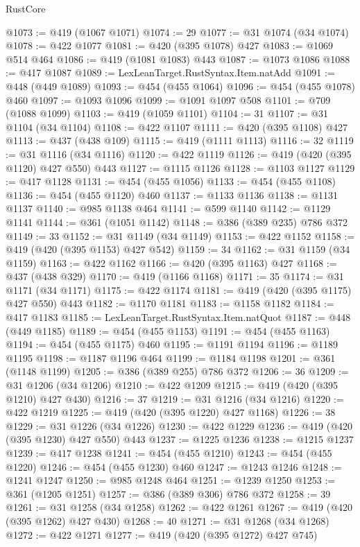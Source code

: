 \begin{lexlean}{RustCore}
\begin{coremodule}
@1073 := @419 (@1067 @1071)
@1074 := 29
@1077 := @31 @1074 (@34 @1074)
@1078 := @422 @1077
@1081 := @420 (@395 @1078) @427
@1083 := @1069 @514 @464
@1086 := @419 (@1081 @1083) @443
@1087 := @1073 @1086
@1088 := @417 @1087
@1089 := LexLeanTarget.RustSyntax.Item.natAdd
@1091 := @448 (@449 @1089)
@1093 := @454 (@455 @1064)
@1096 := @454 (@455 @1078) @460
@1097 := @1093 @1096
@1099 := @1091 @1097 @508
@1101 := @709 (@1088 @1099)
@1103 := @419 (@1059 @1101)
@1104 := 31
@1107 := @31 @1104 (@34 @1104)
@1108 := @422 @1107
@1111 := @420 (@395 @1108) @427
@1113 := @437 (@438 @109)
@1115 := @419 (@1111 @1113)
@1116 := 32
@1119 := @31 @1116 (@34 @1116)
@1120 := @422 @1119
@1126 := @419 (@420 (@395 @1120) @427 @550) @443
@1127 := @1115 @1126
@1128 := @1103 @1127
@1129 := @417 @1128
@1131 := @454 (@455 @1056)
@1133 := @454 (@455 @1108)
@1136 := @454 (@455 @1120) @460
@1137 := @1133 @1136
@1138 := @1131 @1137
@1140 := @985 @1138 @464
@1141 := @599 @1140
@1142 := @1129 @1141
@1144 := @361 (@1051 @1142)
@1148 := @386 (@389 @235) @786 @372
@1149 := 33
@1152 := @31 @1149 (@34 @1149)
@1153 := @422 @1152
@1158 := @419 (@420 (@395 @1153) @427 @542)
@1159 := 34
@1162 := @31 @1159 (@34 @1159)
@1163 := @422 @1162
@1166 := @420 (@395 @1163) @427
@1168 := @437 (@438 @329)
@1170 := @419 (@1166 @1168)
@1171 := 35
@1174 := @31 @1171 (@34 @1171)
@1175 := @422 @1174
@1181 := @419 (@420 (@395 @1175) @427 @550) @443
@1182 := @1170 @1181
@1183 := @1158 @1182
@1184 := @417 @1183
@1185 := LexLeanTarget.RustSyntax.Item.natQuot
@1187 := @448 (@449 @1185)
@1189 := @454 (@455 @1153)
@1191 := @454 (@455 @1163)
@1194 := @454 (@455 @1175) @460
@1195 := @1191 @1194
@1196 := @1189 @1195
@1198 := @1187 @1196 @464
@1199 := @1184 @1198
@1201 := @361 (@1148 @1199)
@1205 := @386 (@389 @255) @786 @372
@1206 := 36
@1209 := @31 @1206 (@34 @1206)
@1210 := @422 @1209
@1215 := @419 (@420 (@395 @1210) @427 @430)
@1216 := 37
@1219 := @31 @1216 (@34 @1216)
@1220 := @422 @1219
@1225 := @419 (@420 (@395 @1220) @427 @1168)
@1226 := 38
@1229 := @31 @1226 (@34 @1226)
@1230 := @422 @1229
@1236 := @419 (@420 (@395 @1230) @427 @550) @443
@1237 := @1225 @1236
@1238 := @1215 @1237
@1239 := @417 @1238
@1241 := @454 (@455 @1210)
@1243 := @454 (@455 @1220)
@1246 := @454 (@455 @1230) @460
@1247 := @1243 @1246
@1248 := @1241 @1247
@1250 := @985 @1248 @464
@1251 := @1239 @1250
@1253 := @361 (@1205 @1251)
@1257 := @386 (@389 @306) @786 @372
@1258 := 39
@1261 := @31 @1258 (@34 @1258)
@1262 := @422 @1261
@1267 := @419 (@420 (@395 @1262) @427 @430)
@1268 := 40
@1271 := @31 @1268 (@34 @1268)
@1272 := @422 @1271
@1277 := @419 (@420 (@395 @1272) @427 @745)

\end{coremodule}
\end{lexlean}
